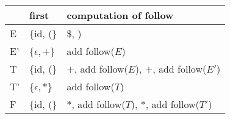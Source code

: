 \documentclass{standalone}
\providecommand\lightrule{%
	\arrayrulecolor{black!30}%
	\midrule[\lightrulewidth]%
	\arrayrulecolor{black}}
\begin{document}
\begin{tabularx}{\textwidth}{XXX}
    & first & computation of follow\\
    \midrule
        E
        &
        \{id, (\}
        &
        \$, )
        \\ \lightrule
        E'
        &
        \{\(\epsilon, +\)\}
        &
        add follow(\(E\))
        \\ \lightrule
        T
        &
        \{id, (\}
        &
        \(+\), add follow(\(E\)), \(+\), add follow(\(E'\))
        \\ \lightrule
        T'
        &
        \{\(\epsilon, *\)\}
        &
        add follow(\(T\))
        \\ \lightrule
        F
        &
        \{id, (\}
        &
        \(*\), add follow(\(T\)), \(*\), add follow(\(T'\))
\end{tabularx}
\end{document}
